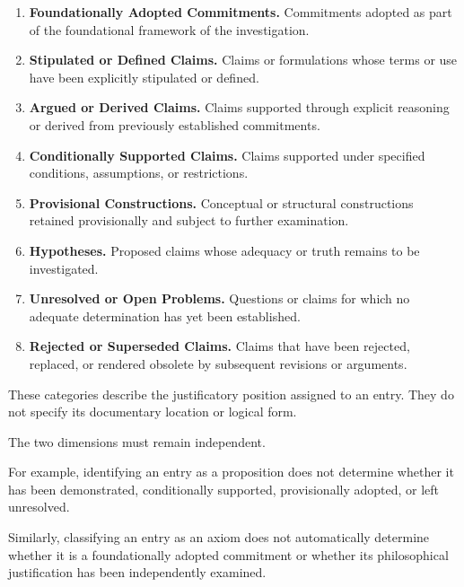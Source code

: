 \begin{enumerate}
    \item \textbf{Foundationally Adopted Commitments.}
          Commitments adopted as part of the foundational
          framework of the investigation.

    \item \textbf{Stipulated or Defined Claims.}
          Claims or formulations whose terms or use have
          been explicitly stipulated or defined.

    \item \textbf{Argued or Derived Claims.}
          Claims supported through explicit reasoning
          or derived from previously established commitments.

    \item \textbf{Conditionally Supported Claims.}
          Claims supported under specified conditions,
          assumptions, or restrictions.

    \item \textbf{Provisional Constructions.}
          Conceptual or structural constructions retained
          provisionally and subject to further examination.

    \item \textbf{Hypotheses.}
          Proposed claims whose adequacy or truth remains
          to be investigated.

    \item \textbf{Unresolved or Open Problems.}
          Questions or claims for which no adequate
          determination has yet been established.

    \item \textbf{Rejected or Superseded Claims.}
          Claims that have been rejected, replaced,
          or rendered obsolete by subsequent revisions
          or arguments.
\end{enumerate}

These categories describe the justificatory position
assigned to an entry. They do not specify its documentary
location or logical form.

The two dimensions must remain independent.

For example, identifying an entry as a proposition does
not determine whether it has been demonstrated, conditionally
supported, provisionally adopted, or left unresolved.

Similarly, classifying an entry as an axiom does not
automatically determine whether it is a foundationally
adopted commitment or whether its philosophical justification
has been independently examined.

